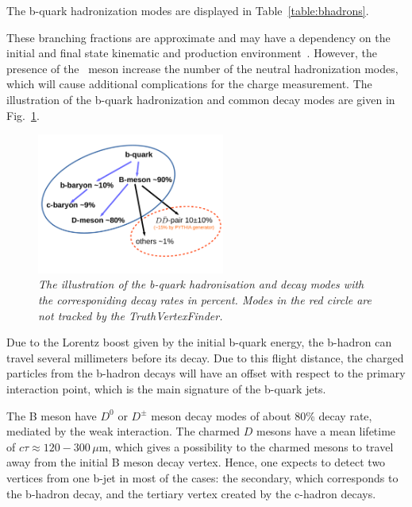 The b-quark hadronization modes are displayed in Table~\ref{table:bhadrons}.


These branching fractions are approximate and may have a dependency on the initial and final state kinematic and production environment~\cite{bib:PDG}.
However, the presence of the \Bzs\ meson increase the number of the neutral hadronization modes, which will cause additional complications for the charge measurement. 
The illustration of the b-quark hadronization and common decay modes are given in Fig.~\ref{fig:Bmodes_3}.
\begin{figure}[h]
	{\centering
		\includegraphics[width=0.55\textwidth]{ILD/plots/b-modes}
		\caption{\sl The illustration of the b-quark hadronisation and decay modes with the corresponiding decay rates in percent. Modes in the red circle are not tracked by the TruthVertexFinder.}
		\label{fig:Bmodes_3}
	}
\end{figure}

Due to the Lorentz boost given by the initial b-quark energy, the b-hadron can travel several millimeters before its decay. Due to this flight distance, the charged particles from the b-hadron decays will have an offset with respect to the primary interaction point, which is the main signature of the b-quark jets. 

The B meson have $D^0$ or $D^\pm$ meson decay modes of about 80\% decay rate, mediated by the weak interaction. The charmed $D$ mesons have a mean lifetime of $c\tau \approx 120 - 300$\,$\mu$m, which gives a possibility to the charmed mesons to travel away from the initial B meson decay vertex. 
Hence, one expects to detect two vertices from one b-jet in most of the cases: the secondary, which corresponds to the b-hadron decay, and the tertiary vertex created by the c-hadron decays. 

